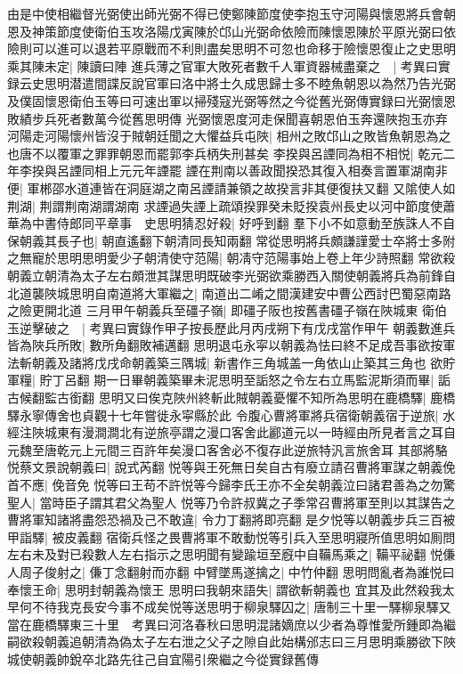 由是中使相繼督光弼使出師光弼不得已使鄭陳節度使李抱玉守河陽與懷恩將兵會朝恩及神策節度使衛伯玉攻洛陽戊寅陳於邙山光弼命依險而陳懷恩陳於平原光弼曰依險則可以進可以退若平原戰而不利則盡矣思明不可忽也命移于險懷恩復止之史思明乘其陳未定|{
	陳讀曰陣}
進兵薄之官軍大敗死者數千人軍資器械盡棄之　|{
	考異曰實録云史思明潜遣間諜反說官軍曰洛中將士久成思歸士多不睦魚朝恩以為然乃告光弼及僕固懷恩衛伯玉等曰可速出軍以掃殘寇光弼等然之今從舊光弼傳實録曰光弼懷恩敗績步兵死者數萬今從舊思明傳}
光弼懷恩度河走保聞喜朝恩伯玉奔還陜抱玉亦弃河陽走河陽懷州皆沒于賊朝廷聞之大懼益兵屯陜|{
	相州之敗邙山之敗皆魚朝恩為之也唐不以覆軍之罪罪朝恩而罷郭李兵柄失刑甚矣}
李揆與呂諲同為相不相悦|{
	乾元二年李揆與呂諲同相上元元年諲罷}
諲在荆南以善政聞揆恐其復入相奏言置軍湖南非便|{
	軍郴邵水道連皆在洞庭湖之南呂諲請兼領之故揆言非其便復扶又翻}
又隂使人如荆湖|{
	荆謂荆南湖謂湖南}
求諲過失諲上疏頌揆罪癸未貶揆袁州長史以河中節度使蕭華為中書侍郎同平章事　史思明猜忍好殺|{
	好呼到翻}
羣下小不如意動至族誅人不自保朝義其長子也|{
	朝直遙翻下朝清同長知兩翻}
常從思明將兵頗謙謹愛士卒將士多附之無寵於思明思明愛少子朝清使守范陽|{
	朝凊守范陽事始上卷上年少詩照翻}
常欲殺朝義立朝清為太子左右頗泄其謀思明既破李光弼欲乘勝西入關使朝義將兵為前鋒自北道襲陜城思明自南道將大軍繼之|{
	南道出二崤之間漢建安中曹公西討巴蜀惡南路之險更開北道}
三月甲午朝義兵至礓子嶺|{
	即礓子阪也按舊書礓子嶺在陜城東}
衛伯玉逆擊破之　|{
	考異曰實錄作甲子按長歷此月丙戌朔下有戊戌當作甲午}
朝義數進兵皆為陜兵所敗|{
	數所角翻敗補邁翻}
思明退屯永寜以朝義為怯曰終不足成吾事欲按軍法斬朝義及諸將戊戌命朝義築三隅城|{
	新書作三角城盖一角依山止築其三角也}
欲貯軍糧|{
	貯丁呂翻}
期一日畢朝義築畢未泥思明至詬怒之令左右立馬監泥斯須而畢|{
	詬古候翻監古銜翻}
思明又曰俟克陜州終斬此賊朝義憂懼不知所為思明在鹿橋驛|{
	鹿橋驛永寧傳舍也貞觀十七年嘗徙永寜縣於此}
令腹心曹將軍將兵宿衛朝義宿于逆旅|{
	水經注陜城東有漫澗澗北有逆旅亭謂之漫口客舍此酈道元以一時經由所見者言之耳自元魏至唐乾元上元間三百許年矣漫口客舍必不復存此逆旅特汎言旅舍耳}
其部將駱悦蔡文景說朝義曰|{
	說式芮翻}
悦等與王死無日矣自古有廢立請召曹將軍謀之朝義俛首不應|{
	俛音免}
悦等曰王苟不許悦等今歸李氏王亦不全矣朝義泣曰諸君善為之勿驚聖人|{
	當時臣子謂其君父為聖人}
悦等乃令許叔冀之子季常召曹將軍至則以其謀告之曹將軍知諸將盡怨恐禍及己不敢違|{
	令力丁翻將即亮翻}
是夕悦等以朝義步兵三百被甲詣驛|{
	被皮義翻}
宿衛兵怪之畏曹將軍不敢動悦等引兵入至思明寢所值思明如厠問左右未及對已殺數人左右指示之思明聞有變踰垣至廐中自鞴馬乘之|{
	鞴平祕翻}
悦傔人周子俊射之|{
	傔丁念翻射而亦翻}
中臂墜馬遂擒之|{
	中竹仲翻}
思明問亂者為誰悦曰奉懷王命|{
	思明封朝義為懷王}
思明曰我朝來語失|{
	謂欲斬朝義也}
宜其及此然殺我太早何不待我克長安今事不成矣悦等送思明于柳泉驛囚之|{
	唐制三十里一驛柳泉驛又當在鹿橋驛東三十里　考異曰河洛春秋曰思明混諸嫡庶以少者為尊惟愛所鍾即為繼嗣欲殺朝義追朝清為偽太子左右泄之父子之隙自此始構邠志曰三月思明乘勝欲下陜城使朝義帥銳卒北路先往己自宜陽引衆繼之今從實録舊傳}
